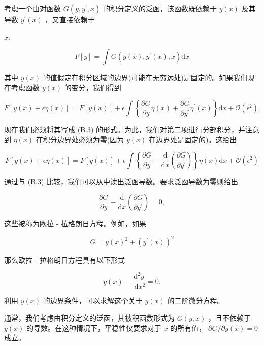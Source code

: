 \documentclass[10pt]{report}
\begin{document}
考虑一个由对函数 \(G\left( {y,{y}^{\prime },x}\right)\) 的积分定义的泛函，该函数既依赖于 \(y\left( x\right)\) 及其导数 \({y}^{\prime }\left( x\right)\) ，又直接依赖于

\(x :\)

\[
F\left\lbrack  y\right\rbrack   = \int G\left( {y\left( x\right) ,{y}^{\prime }\left( x\right) ,x}\right) \mathrm{d}x \tag{B.5}
\]

其中 \(y\left( x\right)\) 的值假定在积分区域的边界(可能在无穷远处)是固定的。如果我们现在考虑函数 \(y\left( x\right)\) 的变分，我们得到

\[
F\left\lbrack  {y\left( x\right)  + {\epsilon \eta }\left( x\right) }\right\rbrack   = F\left\lbrack  {y\left( x\right) }\right\rbrack   + \epsilon \int \left\{  {\frac{\partial G}{\partial y}\eta \left( x\right)  + \frac{\partial G}{\partial {y}^{\prime }}{\eta }^{\prime }\left( x\right) }\right\}  \mathrm{d}x + \mathcal{O}\left( {\epsilon }^{2}\right) . \tag{B.6}
\]

现在我们必须将其写成 (B.3) 的形式。为此，我们对第二项进行分部积分，并注意到 \(\eta \left( x\right)\) 在积分边界处必须为零(因为 \(y\left( x\right)\) 在边界处是固定的)。这给出

\[
F\left\lbrack  {y\left( x\right)  + {\epsilon \eta }\left( x\right) }\right\rbrack   = F\left\lbrack  {y\left( x\right) }\right\rbrack   + \epsilon \int \left\{  {\frac{\partial G}{\partial y} - \frac{\mathrm{d}}{\mathrm{d}x}\left( \frac{\partial G}{\partial {y}^{\prime }}\right) }\right\}  \eta \left( x\right) \mathrm{d}x + \mathcal{O}\left( {\epsilon }^{2}\right)  \tag{B.7}
\]

通过与 (B.3) 比较，我们可以从中读出泛函导数。要求泛函导数为零则给出

\[
\frac{\partial G}{\partial y} - \frac{\mathrm{d}}{\mathrm{d}x}\left( \frac{\partial G}{\partial {y}^{\prime }}\right)  = 0, \tag{B.8}
\]

这些被称为欧拉 - 拉格朗日方程。例如，如果

\[
G = y{\left( x\right) }^{2} + {\left( {y}^{\prime }\left( x\right) \right) }^{2} \tag{B.9}
\]

那么欧拉 - 拉格朗日方程具有以下形式

\[
y\left( x\right)  - \frac{{\mathrm{d}}^{2}y}{\mathrm{\;d}{x}^{2}} = 0. \tag{B.10}
\]

利用 \(y\left( x\right)\) 的边界条件，可以求解这个关于 \(y\left( x\right)\) 的二阶微分方程。

通常，我们考虑由积分定义的泛函，其被积函数形式为 \(G\left( {y,x}\right)\) ，且不依赖于 \(y\left( x\right)\) 的导数。在这种情况下，平稳性仅要求对于 \(x\) 的所有值， \(\partial G/\partial y\left( x\right)  = 0\) 成立。
\end{document}
